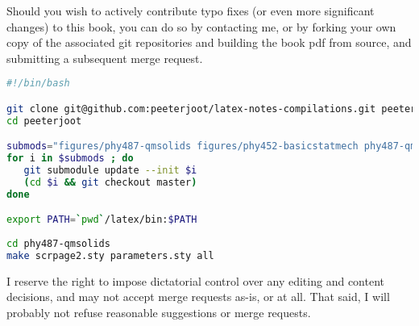 %
%

Should you wish to actively contribute typo fixes (or even more significant changes) to this book, you can do so by contacting me, or by forking your own copy of the associated git repositories and building the book pdf from source, and submitting a subsequent merge request.

\begin{lstlisting}[language=bash]
#!/bin/bash

git clone git@github.com:peeterjoot/latex-notes-compilations.git peeterjoot
cd peeterjoot

submods="figures/phy487-qmsolids figures/phy452-basicstatmech phy487-qmsolids mathematica latex"
for i in $submods ; do
   git submodule update --init $i
   (cd $i && git checkout master)
done

export PATH=`pwd`/latex/bin:$PATH
 
cd phy487-qmsolids
make scrpage2.sty parameters.sty all
\end{lstlisting}

I reserve the right to impose dictatorial control over any editing and content decisions, and may not accept merge requests as-is, or at all. That said, I will probably not refuse reasonable suggestions or merge requests.
